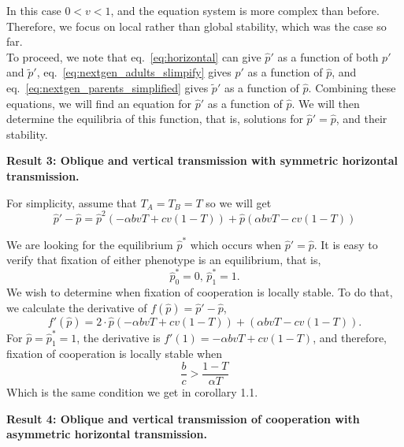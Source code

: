 \documentclass[12pt]{extarticle}
\begin{document}
In this case $0<v<1$, and the equation system is more complex than before.
Therefore, we focus on local rather than global stability, which was the case so far.\\
To proceed, we note that 
eq.~\ref{eq:horizontal} can give $\hat{p}'$ as a function of both $p'$ and $\tilde{p}'$,
eq.~\ref{eq:nextgen_adults_slimpify} gives $p'$ as a function of $\hat{p}$, and 
eq.~\ref{eq:nextgen_parents_simplified} gives $\tilde{p}'$ as a function of $\hat{p}$. 
Combining these equations, we will find an equation for $\hat{p}'$ as a function of $\hat{p}$.
We will then determine the equilibria of this function, that is, solutions for $\hat{p}' = \hat{p}$, and their stability.

\textbf{Result 3: Oblique and vertical transmission with symmetric horizontal transmission.}

For simplicity, assume that $T_A = T_B = T$ so we will get
\begin{equation} \label{eq:equal_horizontal_transmission}
  \hat{p}' - \hat{p} =  \hat{p} ^2(-\alpha bvT + cv(1-T)) + \hat{p} (\alpha bvT -cv(1-T))
\end{equation}

We are looking for the equilibrium $\hat{p}^*$ which occurs when $\hat{p}' = \hat{p}$.
It is easy to verify that fixation of either phenotype is an equilibrium, that is,
\begin{equation} \label{eq:result2.1}
  \hat{p}^*_0 =  0, \, \hat{p}^*_1 = 1 .
\end{equation}
We wish to determine when fixation of cooperation is locally stable. %
To do that, we calculate the derivative of $f(\hat{p}) = \hat{p}'-\hat{p}$, 
\begin{equation} \label{eq:derivative_of_phattag-phat}
 f'(\hat{p}) = 2\cdot\hat{p} (-\alpha bvT + cv(1-T)) + (\alpha bvT -cv(1-T)).
\end{equation}
For $\hat{p} = \hat{p}^*_1=1$, the derivative is
$f'(1) = -\alpha bvT + cv(1-T)$, and therefore, fixation of cooperation is locally stable when
\begin{equation} \label{eq:oblique_and_vertic_result2}
  \frac{b}{c}>\frac{1-T}{\alpha T}
\end{equation}
Which is the same condition we get in corollary 1.1.

\textbf{Result 4: Oblique and vertical transmission of cooperation with asymmetric horizontal transmission.}
\end{document}
